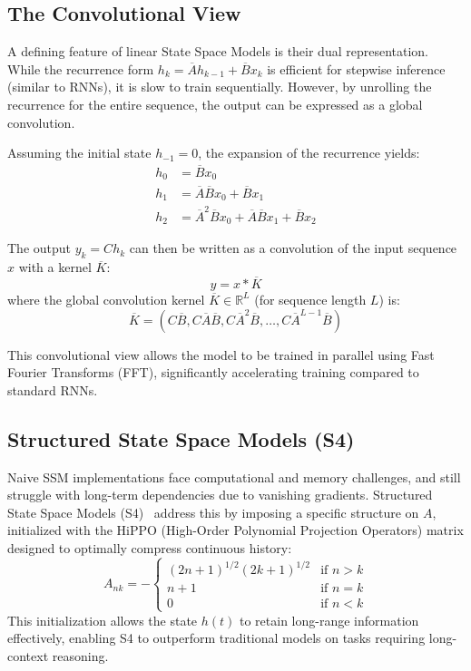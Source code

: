 \subsection{The Convolutional View}
A defining feature of linear State Space Models is their dual representation. While the recurrence form $h_k = \overline{A} h_{k-1} + \overline{B} x_k$ is efficient for stepwise inference (similar to RNNs), it is slow to train sequentially. However, by unrolling the recurrence for the entire sequence, the output can be expressed as a global convolution.

Assuming the initial state $h_{-1} = 0$, the expansion of the recurrence yields:
\begin{align}
    h_0 &= \overline{B} x_0 \\
    h_1 &= \overline{A} \overline{B} x_0 + \overline{B} x_1 \\
    h_2 &= \overline{A}^2 \overline{B} x_0 + \overline{A} \overline{B} x_1 + \overline{B} x_2
\end{align}

The output $y_k = C h_k$ can then be written as a convolution of the input sequence $x$ with a kernel $\overline{K}$:
\begin{equation}
    y = x * \overline{K}
\end{equation}
where the global convolution kernel $\overline{K} \in \mathbb{R}^L$ (for sequence length $L$) is:
\begin{equation}
    \overline{K} = (C\overline{B}, C\overline{A}\overline{B}, C\overline{A}^2\overline{B}, \dots, C\overline{A}^{L-1}\overline{B})
\end{equation}

This convolutional view allows the model to be trained in parallel using Fast Fourier Transforms (FFT), significantly accelerating training compared to standard RNNs.

\subsection{Structured State Space Models (S4)}
Naive SSM implementations face computational and memory challenges, and still struggle with long-term dependencies due to vanishing gradients. Structured State Space Models (S4)~\cite{s4} address this by imposing a specific structure on $A$, initialized with the HiPPO (High-Order Polynomial Projection Operators) matrix designed to optimally compress continuous history:
\begin{equation}
    A_{nk} = - \begin{cases} 
    (2n+1)^{1/2}(2k+1)^{1/2} & \text{if } n > k \\
    n+1 & \text{if } n = k \\
    0 & \text{if } n < k 
    \end{cases}
\end{equation}
This initialization allows the state $h(t)$ to retain long-range information effectively, enabling S4 to outperform traditional models on tasks requiring long-context reasoning.

